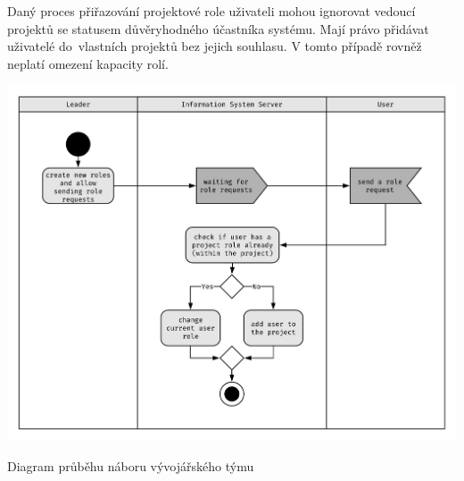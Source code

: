 Daný proces přiřazování projektové role uživateli mohou ignorovat vedoucí projektů se statusem důvěryhodného účastníka systému. Mají právo přidávat uživatelé do~vlastních projektů bez jejich souhlasu. V tomto případě rovněž neplatí omezení kapacity rolí.


\begin{fig:illustration}
   \includegraphics[width=1\textwidth]{images/dia-ak-role-assing.pdf}
   \caption[Diagram průběhu náboru týmu]{Diagram průběhu náboru vývojářského týmu}\label{pic:dia-ak-role-assing}
\end{fig:illustration}
